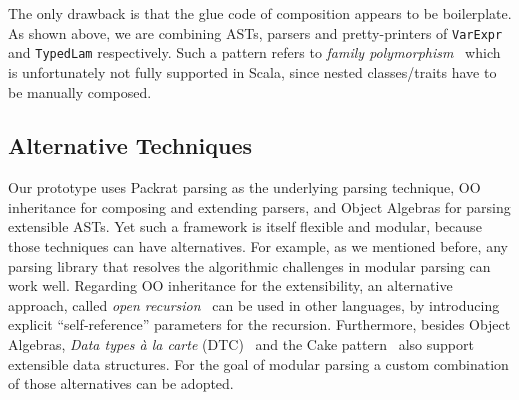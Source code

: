 The only drawback is that the glue code of composition appears to be
boilerplate. As shown above, we are combining ASTs, parsers and
pretty-printers of \lstinline{VarExpr} and \lstinline{TypedLam}
respectively. Such a pattern refers to \textit{family
  polymorphism}~\cite{ernst01FP} which is unfortunately not fully supported
in Scala, since nested classes/traits have to be manually composed.

\subsection{Alternative Techniques}

Our prototype uses Packrat parsing as the underlying parsing technique, OO inheritance for composing and extending parsers, and Object Algebras for parsing extensible ASTs. Yet such a framework is itself flexible and modular, because those techniques can have alternatives.
For example, as we mentioned before, any parsing library
that resolves the algorithmic challenges in modular parsing can work well. Regarding OO inheritance for the extensibility, an alternative approach, called \textit{open recursion}~\cite{CookThesis} can be used in other languages, by introducing explicit ``self-reference'' parameters for the recursion. Furthermore, besides Object Algebras, \textit{Data types \`a la carte} (DTC)~\cite{swierstra2008data} and the Cake pattern~\cite{odersky2005independently} also support extensible data structures. For the goal of modular parsing a custom combination of those alternatives can be adopted.
